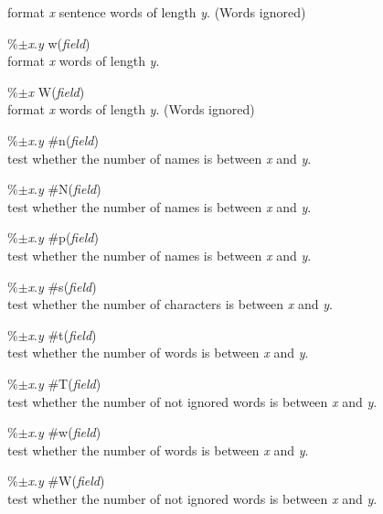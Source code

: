 \documentclass[a4paper]{article}
\newenvironment{FlatList}{\begin{list}{}{%
      \topsep=0pt\itemsep=0pt\parsep=0pt\let\makelabel=\flatlistlabel}}{\end{list}}%
\newcommand\flatlistlabel[1]{\descriptionlabel{\textsf{#1}}}
\begin{document}
\begin{multicols}{4}
\begin{FlatList}
    format \textit{x}\/ sentence words  of length \textit{y}. (Words ignored)
  \item [\%$\pm $\textit{x}.\textit{y}\/ w(\textit{field}\/)]\ \\
    format \textit{x}\/ words of length \textit{y}.
  \item [\%$\pm $\textit{x}\/ W(\textit{field}\/)]\ \\
    format \textit{x}\/ words of length \textit{y}. (Words ignored)
  \item [\%$\pm $\textit{x}.\textit{y}\/ \#n(\textit{field}\/)]\ \\
    test whether the  number of names is between \textit{x}\/ and \textit{y}.
  \item [\%$\pm $\textit{x}.\textit{y}\/ \#N(\textit{field}\/)]\ \\
    test whether the  number of names is between \textit{x}\/ and \textit{y}.
  \item [\%$\pm $\textit{x}.\textit{y}\/ \#p(\textit{field}\/)]\ \\
    test whether the  number of names is between \textit{x}\/ and \textit{y}.
  \item [\%$\pm $\textit{x}.\textit{y}\/ \#s(\textit{field}\/)]\ \\
    test whether the  number of characters is between \textit{x}\/ and \textit{y}.
  \item [\%$\pm $\textit{x}.\textit{y}\/ \#t(\textit{field}\/)]\ \\
    test whether the  number of words is between \textit{x}\/ and \textit{y}.
  \item [\%$\pm $\textit{x}.\textit{y}\/ \#T(\textit{field}\/)]\ \\
    test whether the  number of not ignored words is between \textit{x}\/
    and \textit{y}. 
  \item [\%$\pm $\textit{x}.\textit{y}\/ \#w(\textit{field}\/)]\ \\
    test whether the  number of words is between \textit{x}\/ and \textit{y}.
  \item [\%$\pm $\textit{x}.\textit{y}\/ \#W(\textit{field}\/)]\ \\
    test whether the  number of not ignored words is between \textit{x}\/
    and \textit{y}. 
  \end{FlatList} 


\end{multicols}
\end{document}

